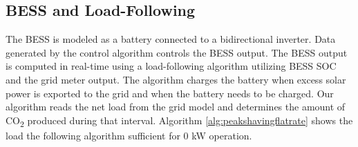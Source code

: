 \documentclass[conference, usletter]{IEEEtran}
\begin{document}
\subsection{BESS and Load-Following}
The BESS is modeled as a battery connected to a bidirectional inverter. Data generated by the control algorithm controls the BESS output. The BESS output is computed in real-time using a load-following algorithm utilizing  BESS SOC and the grid meter output. The algorithm charges the battery when excess solar power is exported to the grid and when the battery needs to be charged. Our algorithm reads the net load from the grid model and determines the amount of CO\textsubscript{2} produced during that interval. Algorithm \ref{alg:peakshavingflatrate} shows the load the following algorithm sufficient for 0 kW operation. 
\end{document}
